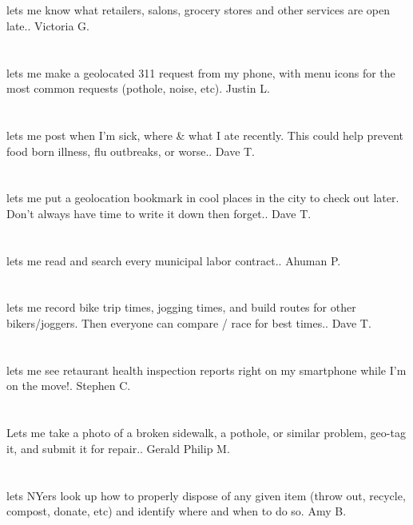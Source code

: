 \section{}lets me know what retailers,  salons,  grocery stores and other services are open late.. Victoria G.
\section{}lets me make a geolocated 311 request from my phone,  with menu icons for the most common requests (pothole,  noise,  etc). Justin L.
\section{}lets me post when I'm sick,  where \& what I ate recently.  This could help prevent food born illness,  flu outbreaks,  or worse.. Dave T.
\section{}lets me put a geolocation bookmark in cool places in the city to check out later. Don't always have time to write it down then forget.. Dave T.
\section{}lets me read and search every municipal labor contract.. Ahuman P.
\section{}lets me record bike trip times,  jogging times,  and build routes for other bikers/joggers. Then everyone can compare / race for best times.. Dave T.
\section{}lets me see retaurant health inspection reports right on my smartphone while I'm on the move!. Stephen C.
\section{}Lets me take a photo of a broken sidewalk,  a pothole,  or similar problem,  geo-tag it,  and submit it for repair.. Gerald Philip M.
\section{}lets NYers look up how to properly dispose of any given item (throw out,  recycle,  compost,  donate,  etc) and identify where and when to do so. Amy B.
